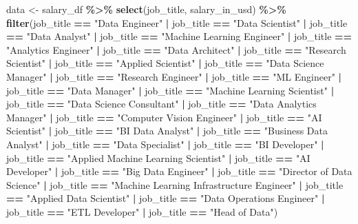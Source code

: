 \documentclass[
]{article}
\newenvironment{Shaded}{\begin{snugshade}}{\end{snugshade}}
\newcommand{\FunctionTok}[1]{\textcolor[rgb]{0.13,0.29,0.53}{\textbf{#1}}}
\newcommand{\NormalTok}[1]{#1}
\newcommand{\OtherTok}[1]{\textcolor[rgb]{0.56,0.35,0.01}{#1}}
\newcommand{\SpecialCharTok}[1]{\textcolor[rgb]{0.81,0.36,0.00}{\textbf{#1}}}
\newcommand{\StringTok}[1]{\textcolor[rgb]{0.31,0.60,0.02}{#1}}
\begin{document}
\begin{Shaded}
\begin{Highlighting}[]
\NormalTok{data }\OtherTok{\textless{}{-}}\NormalTok{ salary\_df }\SpecialCharTok{\%\textgreater{}\%}
  \FunctionTok{select}\NormalTok{(job\_title, salary\_in\_usd) }\SpecialCharTok{\%\textgreater{}\%}
  \FunctionTok{filter}\NormalTok{(job\_title }\SpecialCharTok{==} \StringTok{"Data Engineer"} \SpecialCharTok{|}\NormalTok{ job\_title }\SpecialCharTok{==} \StringTok{"Data Scientist"} \SpecialCharTok{|}\NormalTok{ job\_title }\SpecialCharTok{==} \StringTok{"Data Analyst"} \SpecialCharTok{|}\NormalTok{ job\_title }\SpecialCharTok{==} \StringTok{"Machine Learning Engineer"} \SpecialCharTok{|}\NormalTok{ job\_title }\SpecialCharTok{==} \StringTok{"Analytics Engineer"} \SpecialCharTok{|}\NormalTok{ job\_title }\SpecialCharTok{==} \StringTok{"Data Architect"} \SpecialCharTok{|}\NormalTok{ job\_title }\SpecialCharTok{==} \StringTok{"Research Scientist"} \SpecialCharTok{|}\NormalTok{ job\_title }\SpecialCharTok{==} \StringTok{"Applied Scientist"} \SpecialCharTok{|}\NormalTok{ job\_title }\SpecialCharTok{==} \StringTok{"Data Science Manager"} \SpecialCharTok{|}\NormalTok{ job\_title }\SpecialCharTok{==} \StringTok{"Research Engineer"} \SpecialCharTok{|}\NormalTok{ job\_title }\SpecialCharTok{==} \StringTok{"ML Engineer"} \SpecialCharTok{|}\NormalTok{ job\_title }\SpecialCharTok{==} \StringTok{"Data Manager"} \SpecialCharTok{|}\NormalTok{ job\_title }\SpecialCharTok{==} \StringTok{"Machine Learning Scientist"} \SpecialCharTok{|}\NormalTok{ job\_title }\SpecialCharTok{==} \StringTok{"Data Science Consultant"} \SpecialCharTok{|}\NormalTok{ job\_title }\SpecialCharTok{==} \StringTok{"Data Analytics Manager"} \SpecialCharTok{|}\NormalTok{ job\_title }\SpecialCharTok{==} \StringTok{"Computer Vision Engineer"} \SpecialCharTok{|}\NormalTok{ job\_title }\SpecialCharTok{==} \StringTok{"AI Scientist"} \SpecialCharTok{|}\NormalTok{ job\_title }\SpecialCharTok{==} \StringTok{"BI Data Analyst"} \SpecialCharTok{|}\NormalTok{ job\_title }\SpecialCharTok{==} \StringTok{"Business Data Analyst"} \SpecialCharTok{|}\NormalTok{ job\_title }\SpecialCharTok{==} \StringTok{"Data Specialist"} \SpecialCharTok{|}\NormalTok{ job\_title }\SpecialCharTok{==} \StringTok{"BI Developer"} \SpecialCharTok{|}\NormalTok{ job\_title }\SpecialCharTok{==} \StringTok{"Applied Machine Learning Scientist"} \SpecialCharTok{|}\NormalTok{ job\_title }\SpecialCharTok{==} \StringTok{"AI Developer"} \SpecialCharTok{|}\NormalTok{ job\_title }\SpecialCharTok{==} \StringTok{"Big Data Engineer"} \SpecialCharTok{|}\NormalTok{ job\_title }\SpecialCharTok{==} \StringTok{"Director of Data Science"} \SpecialCharTok{|}\NormalTok{ job\_title }\SpecialCharTok{==} \StringTok{"Machine Learning Infrastructure Engineer"} \SpecialCharTok{|}\NormalTok{ job\_title }\SpecialCharTok{==} \StringTok{"Applied Data Scientist"} \SpecialCharTok{|}\NormalTok{ job\_title }\SpecialCharTok{==} \StringTok{"Data Operations Engineer"} \SpecialCharTok{|}\NormalTok{ job\_title }\SpecialCharTok{==} \StringTok{"ETL Developer"} \SpecialCharTok{|}\NormalTok{ job\_title }\SpecialCharTok{==} \StringTok{"Head of Data"}\NormalTok{)}


\end{Highlighting}
\end{Shaded}
\end{document}
